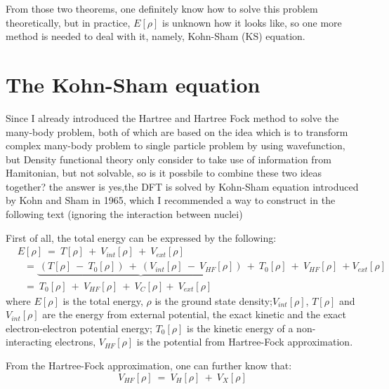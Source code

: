 \documentclass[a4paper, 12pt, titlepage,oneside,drop]{kthesis}
\begin{document}
\noindent From those two theorems, one definitely know how to solve this problem theoretically, but in practice, $E[\rho]$ is unknown how it looks like, 
so one more method is needed to deal with it, namely, Kohn-Sham (KS) equation.

\section{The Kohn-Sham equation}

\noindent Since I already introduced the Hartree and Hartree Fock method to solve the many-body problem, both of which are based on the idea which is to transform complex 
many-body problem to single particle problem by using wavefunction, but Density functional theory only consider to take use of information from Hamitonian, but not solvable, 
so is it possbile to combine these two ideas together? the answer is yes,the DFT is solved by Kohn-Sham equation introduced by Kohn and Sham in 1965,
which I recommended a way to construct in the following text (ignoring the interaction between nuclei)

\noindent First of all, the total energy can be expressed by the following:
\begin{equation}
\label{kse}
\begin{split}
&E[\rho] \ =\ T[\rho] \ + \ V_\textit{int}[\rho] \ + \ V_\textit{ext}[\rho]  \\
&\ \ \   = \underbrace{\ (T[\rho] \ - \ T_{0}[\rho]) \ + \  (V_\textit{int}[\rho] \ - \ V_\textit{HF}[\rho])\ }+ \ T_{0}[\rho] \ + \ V_\textit{HF}[\rho] \ + V_\textit{ext}[\rho]       \\
&\ \ \   = \ T_{0}[\rho] \ + \ V_\textit{HF}[\rho] \ + \ V_\textit{C}[\rho] +\ V_\textit{ext}[\rho]
\end{split}
\end{equation}
\noindent where $E[\rho]$  is the total energy, $\rho$ is the ground state density;$V_\textit{int}[\rho]$, $T[\rho]$ and $V_\textit{int}[\rho]$ are the energy from external potential, the exact kinetic 
and the exact electron-electron potential energy; $T_{0}[\rho]$ is the kinetic energy of a non-interacting electrons, $V_\textit{HF}[\rho]$ is the potential  from Hartree-Fock approximation.

\noindent From the Hartree-Fock approximation, one can further know that:
\begin{equation}
 V_\textit{HF}[\rho] \ = \ V_\textit{H}[\rho] \ + \ V_\textit{X}[\rho] 
\end{equation}
\end{document}
